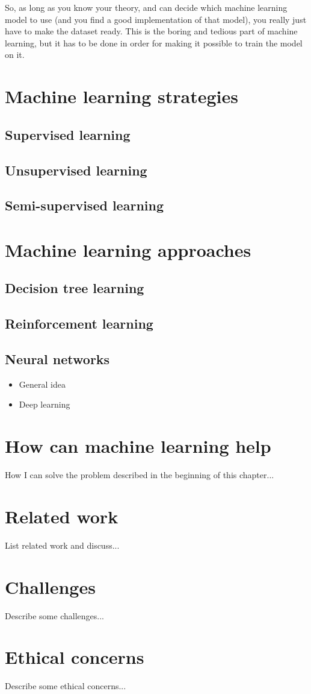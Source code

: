 So, as long as you know your theory, and can decide which machine learning model to use (and you find a good 
implementation of that model), you really just have to make the dataset ready. This is the boring and tedious part 
of machine learning, but it has to be done in order for making it possible to train the model on it. 



\newpage
\section{Machine learning strategies}
\subsection{Supervised learning}
\subsection{Unsupervised learning}
\subsection{Semi-supervised learning}

\newpage
\section{Machine learning approaches}
\subsection{Decision tree learning}
\subsection{Reinforcement learning}
\subsection{Neural networks}
\begin{itemize}
    \item General idea
    \item Deep learning
\end{itemize}

\newpage
\section{How can machine learning help}
How I can solve the problem described in the beginning of this chapter...

\newpage
\section{Related work}
List related work and discuss...

\newpage
\section{Challenges}
Describe some challenges...

\newpage
\section{Ethical concerns}
Describe some ethical concerns...
